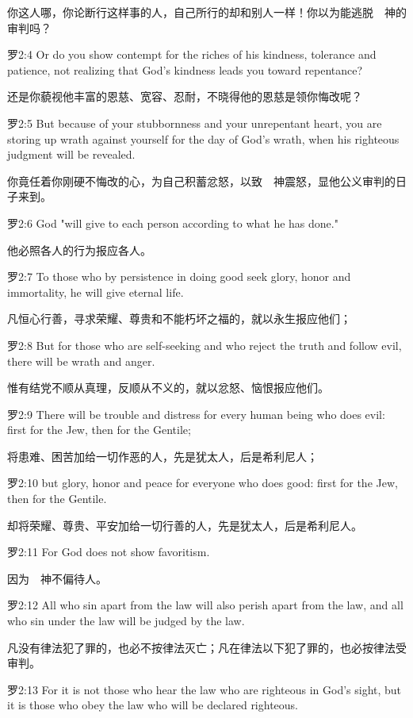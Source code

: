 \documentclass[a4paper,11pt,onecolumn,twoside]{ctexart}
\begin{document}
\begin{multicols}{2}
 你这人哪，你论断行这样事的人，自己所行的却和别人一样！你以为能逃脱　神的审判吗？


 罗2:4
 Or do you show contempt for the riches of his kindness, tolerance and patience, not realizing that God's kindness leads you toward repentance?

 还是你藐视他丰富的恩慈、宽容、忍耐，不晓得他的恩慈是领你悔改呢？


 罗2:5
 But because of your stubbornness and your unrepentant heart, you are storing up wrath against yourself for the day of God's wrath, when his righteous judgment will be revealed.

 你竟任着你刚硬不悔改的心，为自己积蓄忿怒，以致　神震怒，显他公义审判的日子来到。


 罗2:6
 God "will give to each person according to what he has done."

 他必照各人的行为报应各人。


 罗2:7
 To those who by persistence in doing good seek glory, honor and immortality, he will give eternal life.

 凡恒心行善，寻求荣耀、尊贵和不能朽坏之福的，就以永生报应他们；


 罗2:8
 But for those who are self-seeking and who reject the truth and follow evil, there will be wrath and anger.

 惟有结党不顺从真理，反顺从不义的，就以忿怒、恼恨报应他们。


 罗2:9
 There will be trouble and distress for every human being who does evil: first for the Jew, then for the Gentile;

 将患难、困苦加给一切作恶的人，先是犹太人，后是希利尼人；


 罗2:10
 but glory, honor and peace for everyone who does good: first for the Jew, then for the Gentile.

 却将荣耀、尊贵、平安加给一切行善的人，先是犹太人，后是希利尼人。


 罗2:11
 For God does not show favoritism.

 因为　神不偏待人。


 罗2:12
 All who sin apart from the law will also perish apart from the law, and all who sin under the law will be judged by the law.

 凡没有律法犯了罪的，也必不按律法灭亡；凡在律法以下犯了罪的，也必按律法受审判。


 罗2:13
 For it is not those who hear the law who are righteous in God's sight, but it is those who obey the law who will be declared righteous.


\end{multicols}
\end{document}
